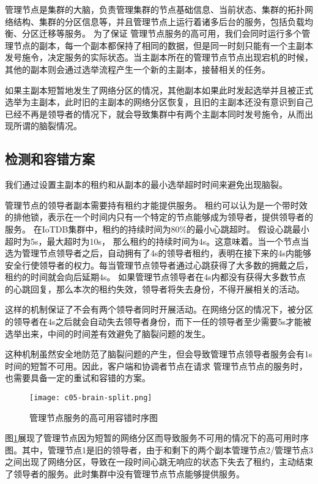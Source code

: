 管理节点是集群的大脑，负责管理集群的节点基础信息、当前状态、集群的拓扑网络结构、集群的分区信息等，并且管理节点上运行着诸多后台的服务，包括负载均衡、分区迁移等服务。
为了保证
管理节点服务的高可用，我们会同时运行多个管理节点的副本，每一个副本都保持了相同的数据，但是同一时刻只能有一个主副本发号施令，决定服务的实际状态。当主副本所在的管理节点节点出现宕机的时候，其他的副本则会通过选举流程产生一个新的主副本，接替相关的任务。

如果主副本短暂地发生了网络分区的情况，其他副本如果此时发起选举并且被正式选举为主副本，此时旧的主副本的网络分区恢复，且旧的主副本还没有意识到自己已经不再是领导者的情况下，就会导致集群中有两个主副本同时发号施令，从而出现所谓的脑裂情况。

\subsection{检测和容错方案}

我们通过设置主副本的租约和从副本的最小选举超时时间来避免出现脑裂。


管理节点的领导者副本需要持有租约才能提供服务。
租约可以认为是一个带时效的排他锁，表示在一个时间内只有一个特定的节点能够成为领导者，提供领导者的服务。
在IoTDB集群中，租约的持续时间为80\%的最小心跳超时。
假设心跳最小超时为5s，最大超时为10s，
那么租约的持续时间为4s。这意味着。当一个节点当选为管理节点领导者之后，自动拥有了4s的领导者租约，表明在接下来的4s内能够安全行使领导者的权力。每当管理节点领导者通过心跳获得了大多数的拥戴之后，租约的时间就会向后延期4s。
如果管理节点领导者在4s内都没有获得大多数节点的心跳回复，那么本次的租约失效，领导者将失去身份，不得开展相关的活动。

这样的机制保证了不会有两个领导者同时开展活动。在网络分区的情况下，被分区的领导者在4s之后就会自动失去领导者身份，而下一任的领导者至少需要5s才能被选举出来，中间的时间差有效避免了脑裂问题的发生。

这种机制虽然安全地防范了脑裂问题的产生，但会导致管理节点领导者服务会有1s时间的短暂不可用。因此，客户端和协调者节点在请求
管理节点节点的服务时，也需要具备一定的重试和容错的方案。

\begin{figure}
    \centering
    \texttt{[image: c05-brain-split.png]}
    \caption{管理节点服务的高可用容错时序图}
    \label{fig:c05-brain-split}
\end{figure}

图\ref{fig:c05-brain-split}展现了管理节点因为短暂的网络分区而导致服务不可用的情况下的高可用时序图。其中，管理节点1是旧的领导者，由于和剩下的两个副本管理节点2/管理节点3之间出现了网络分区，导致在一段时间心跳无响应的状态下失去了租约，主动结束了领导者的服务。此时集群中没有管理节点节点能够提供服务。


